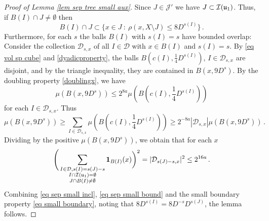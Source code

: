 {    \begin{proof}[Proof of Lemma \ref{lem sep tree small aux}]
        Since $J \in \mathcal{J}'$ we have $J \subset \mathcal{I}(\mathfrak u_1)$. Thus, if $B(I) \cap J \ne \emptyset$ then
    \begin{equation}
        \label{eq sep small incl}
        B(I) \cap J \subset \{x \in J \ : \ \rho(x, X \setminus J) \le 8D^{s(I)}\}\,.
    \end{equation}
    Furthermore, for each $s$ the balls $B(I)$ with $s(I) = s$ have bounded overlap: Consider the collection $\mathcal{D}_{s,x}$ of all $I \in \mathcal{D}$ with $x \in B(I)$ and $s(I) = s$. By \eqref{eq vol sp cube} and \eqref{dyadicproperty}, the balls $B(c(I), \frac{1}{4} D^{s(I)})$, $I \in \mathcal{D}_{s,x}$ are disjoint, and by the triangle inequality, they are contained in $B(x, 9 D^{s})$. By the doubling property \eqref{doublingx}, we have
    $$
        \mu(B(x, 9D^{s})) \le 2^{8a} \mu(B(c(I), \frac{1}{4} D^{s(I)}))
    $$
    for each $I \in \mathcal{D}_{s,x}$.
    Thus
    $$
        \mu(B(x, 9D^{s})) \ge \sum_{I \in \mathcal{D}_{s,x}} \mu(B(c(I), \frac{1}{4} D^{s(I)})) \ge 2^{-8a} |\mathcal{D}_{s,x}| \mu(B(x, 9D^{s}))\,.
    $$
    Dividing by the positive $\mu(B(x, 9D^{s}))$, we obtain that for each $x$
    \begin{equation}
        \label{eq sep small bound}
        \Bigg(\sum_{\substack{I \in \mathcal{D}, s(I) = s(J) - s\\ I \cap \mathcal{I}(\mathfrak u_1) = \emptyset\\
        J \cap B(I) \ne \emptyset}} \mathbf{1}_{B(I)}(x) \bigg)^2 = |\mathcal{D}_{s(J) - s,x}|^2 \le 2^{16a} \,.
    \end{equation}
    Combining \eqref{eq sep small incl}, \eqref{eq sep small bound} and the small boundary property \eqref{eq small boundary}, noting that $8D^{s(I)}=8D^{-s}D^{s(J)}$, the lemma follows.
\end{proof}


}
